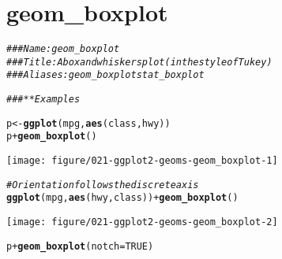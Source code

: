 \documentclass[a4paper,titlepage]{tufte-handout}\usepackage[]{graphicx}\usepackage[]{xcolor}
\makeatletter
\def\maxwidth{ %
  \ifdim\Gin@nat@width>\linewidth
    \linewidth
  \else
    \Gin@nat@width
  \fi
}
\newcommand{\hlnum}[1]{\textcolor[rgb]{0.686,0.059,0.569}{#1}}%
\newcommand{\hlcom}[1]{\textcolor[rgb]{0.678,0.584,0.686}{\textit{#1}}}%
\newcommand{\hlopt}[1]{\textcolor[rgb]{0,0,0}{#1}}%
\newcommand{\hldef}[1]{\textcolor[rgb]{0.345,0.345,0.345}{#1}}%
\newcommand{\hlkwb}[1]{\textcolor[rgb]{0.69,0.353,0.396}{#1}}%
\newcommand{\hlkwc}[1]{\textcolor[rgb]{0.333,0.667,0.333}{#1}}%
\newcommand{\hlkwd}[1]{\textcolor[rgb]{0.737,0.353,0.396}{\textbf{#1}}}%
\newenvironment{kframe}{%
 \def\at@end@of@kframe{}%
 \ifinner\ifhmode%
  \def\at@end@of@kframe{\end{minipage}}%
  \begin{minipage}{\columnwidth}%
 \fi\fi%
 \def\FrameCommand##1{\hskip\@totalleftmargin \hskip-\fboxsep
 \colorbox{shadecolor}{##1}\hskip-\fboxsep
     \hskip-\linewidth \hskip-\@totalleftmargin \hskip\columnwidth}%
 \MakeFramed {\advance\hsize-\width
   \@totalleftmargin\z@ \linewidth\hsize
   \@setminipage}}%
 {\par\unskip\endMakeFramed%
 \at@end@of@kframe}
\newenvironment{knitrout}{}{} %
\makeatother
\begin{document}
\section{geom\_boxplot}

\begin{knitrout}
\color{fgcolor}\begin{kframe}
\begin{alltt}
\hlcom{### Name: geom_boxplot}
\hlcom{### Title: A box and whiskers plot (in the style of Tukey)}
\hlcom{### Aliases: geom_boxplot stat_boxplot}

\hlcom{### ** Examples}

\hldef{p} \hlkwb{<-} \hlkwd{ggplot}\hldef{(mpg,} \hlkwd{aes}\hldef{(class, hwy))}
\hldef{p} \hlopt{+} \hlkwd{geom_boxplot}\hldef{()}
\end{alltt}
\end{kframe}
\texttt{[image: figure/021-ggplot2-geoms-geom\_boxplot-1]} 
\begin{kframe}\begin{alltt}
\hlcom{# Orientation follows the discrete axis}
\hlkwd{ggplot}\hldef{(mpg,} \hlkwd{aes}\hldef{(hwy, class))} \hlopt{+} \hlkwd{geom_boxplot}\hldef{()}
\end{alltt}
\end{kframe}
\texttt{[image: figure/021-ggplot2-geoms-geom\_boxplot-2]} 
\begin{kframe}\begin{alltt}
\hldef{p} \hlopt{+} \hlkwd{geom_boxplot}\hldef{(}\hlkwc{notch} \hldef{=} \hlnum{TRUE}\hldef{)}
\end{alltt}



\end{kframe}
\end{knitrout}
\end{document}
